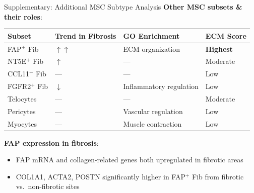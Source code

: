 \documentclass[aspectratio=169,10pt]{beamer}
\newcommand{\pos}[1]{\textcolor{positive}{#1}}
\newcommand{\con}[1]{\textcolor{negative}{#1}}
\begin{document}
\begin{frame}{Supplementary: Additional MSC Subtype Analysis}
\textbf{Other MSC subsets \& their roles}:
\begin{center}
\begin{tabular}{llll}
\toprule
\textbf{Subset} & \textbf{Trend in Fibrosis} & \textbf{GO Enrichment} & \textbf{ECM Score} \\
\midrule
FAP$^+$ Fib & \pos{$\uparrow\uparrow$} & ECM organization & \textbf{Highest} \\
NT5E$^+$ Fib & $\uparrow$ & --- & Moderate \\
CCL11$^+$ Fib & --- & --- & Low \\
FGFR2$^+$ Fib & \con{$\downarrow$} & Inflammatory regulation & Low \\
Telocytes & --- & --- & Moderate \\
Pericytes & --- & Vascular regulation & Low \\
Myocytes & --- & Muscle contraction & Low \\
\bottomrule
\end{tabular}
\end{center}
\vspace{6pt}

\textbf{FAP expression in fibrosis}:
\begin{itemize}
  \item FAP mRNA and collagen-related genes both \pos{upregulated} in fibrotic areas
  \item COL1A1, ACTA2, POSTN significantly higher in FAP$^+$ Fib from fibrotic vs.\ non-fibrotic sites
\end{itemize}
\end{frame}
\end{document}
